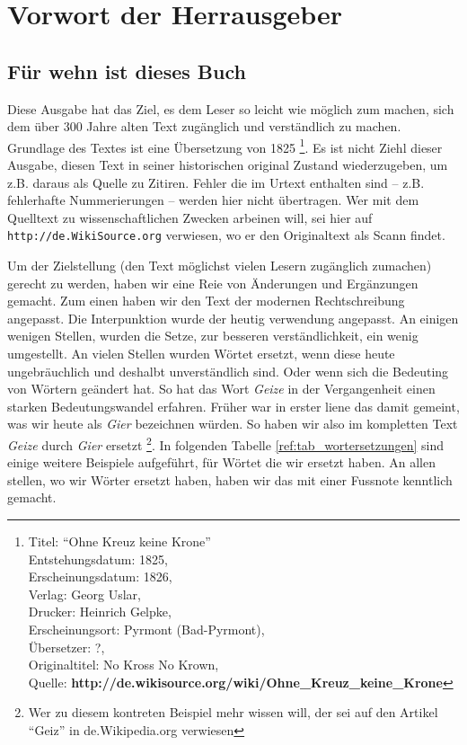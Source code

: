 \part{Vorwort der Herrausgeber}

\chapter{Für wehn ist dieses Buch}

Diese Ausgabe hat das Ziel, es dem Leser so leicht wie möglich zum machen, sich dem über 300 Jahre alten Text zugänglich und verständlich zu machen. Grundlage des Textes ist eine Übersetzung von 1825 \footnote{
Titel: "`Ohne Kreuz keine Krone"' \\
Entstehungsdatum: 1825, \\
Erscheinungsdatum: 1826, \\
Verlag: Georg Uslar, \\
Drucker: Heinrich Gelpke, \\
Erscheinungsort: Pyrmont (Bad-Pyrmont),\\
Übersetzer: ?, \\
Originaltitel: No Kross No Krown, \\
Quelle: \textbf{http://de.wikisource.org/wiki/Ohne\_Kreuz\_keine\_Krone}}. Es ist nicht Ziehl dieser Ausgabe, diesen Text in seiner historischen original Zustand wiederzugeben, um z.B. daraus als Quelle zu Zitiren. Fehler die im Urtext enthalten sind -- z.B. fehlerhafte Nummerierungen -- werden hier nicht übertragen. Wer mit dem Quelltext zu wissenschaftlichen Zwecken arbeinen will, sei hier auf \texttt{http://de.WikiSource.org} verwiesen, wo er den Originaltext als Scann findet.

\medskip

Um der Zielstellung (den Text möglichst vielen Lesern zugänglich zumachen) gerecht zu werden, haben wir eine Reie von Änderungen und Ergänzungen gemacht. Zum einen haben wir den Text der modernen Rechtschreibung angepasst. Die Interpunktion wurde der heutig verwendung angepasst. An einigen wenigen Stellen, wurden die Setze, zur besseren verständlichkeit, ein wenig umgestellt. An vielen Stellen wurden Wörtet ersetzt, wenn diese heute ungebräuchlich und deshalbt unverständlich sind. Oder wenn sich die Bedeuting von Wörtern geändert hat. So hat das Wort \textit{Geize} in der Vergangenheit einen starken Bedeutungswandel erfahren. Früher war in erster liene das damit gemeint, was wir heute als \textit{Gier} bezeichnen würden. So haben wir also im kompletten Text \textit{Geize} durch \textit{Gier} ersetzt \footnote{Wer zu diesem kontreten Beispiel mehr wissen will, der sei auf den Artikel "`Geiz"' in de.Wikipedia.org verwiesen}. In folgenden Tabelle \ref{ref:tab_wortersetzungen} sind einige weitere Beispiele aufgeführt, für Wörtet die wir ersetzt haben. An allen stellen, wo wir Wörter ersetzt haben, haben wir das mit einer Fussnote kenntlich gemacht.

